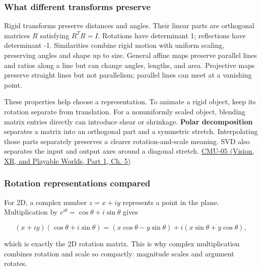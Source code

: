 \subsubsection{What different transforms preserve}\label{03-visual-computing-i-ch001-what-different-transforms-preserve}

\hypertarget{03-visual-computing-i-ch001-what-different-transforms-preserve}{}

Rigid transforms preserve distances and angles. Their linear parts are orthogonal matrices \(R\) satisfying \(R^TR=I\). Rotations have determinant 1; reflections have determinant -1. Similarities combine rigid motion with uniform scaling, preserving angles and shape up to size. General affine maps preserve parallel lines and ratios along a line but can change angles, lengths, and area. Projective maps preserve straight lines but not parallelism; parallel lines can meet at a vanishing point.

These properties help choose a representation. To animate a rigid object, keep its rotation separate from translation. For a nonuniformly scaled object, blending matrix entries directly can introduce shear or shrinkage. \textbf{Polar decomposition} separates a matrix into an orthogonal part and a symmetric stretch. Interpolating those parts separately preserves a clearer rotation-and-scale meaning. SVD also separates the input and output axes around a diagonal stretch. \href{../07-Vision-XR-and-Playable-Worlds-P01/main.pdf\#04-visual-computing-ii-ch036-cmu-05---spatial-transformations}{CMU-05 (Vision, XR, and Playable Worlds, Part 1, Ch. 5)}

\subsubsection{Rotation representations compared}\label{03-visual-computing-i-ch001-rotation-representations-compared}

\hypertarget{03-visual-computing-i-ch001-rotation-representations-compared}{}

For 2D, a complex number \(z=x+iy\) represents a point in the plane. Multiplication by \(e^{i\theta}=\cos\theta+i\sin\theta\) gives

\[
(x+iy)(\cos\theta+i\sin\theta)=(x\cos\theta-y\sin\theta)+i(x\sin\theta+y\cos\theta),
\]

which is exactly the 2D rotation matrix. This is why complex multiplication combines rotation and scale so compactly: magnitude scales and argument rotates.

